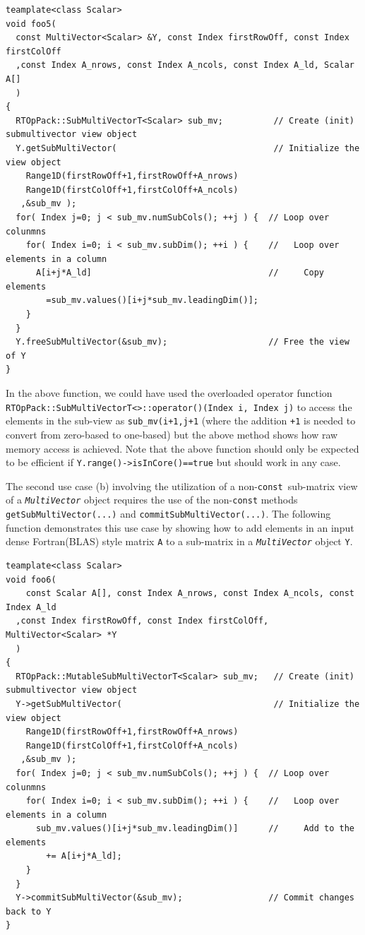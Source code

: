 {\scriptsize\begin{verbatim}
teamplate<class Scalar>
void foo5(
  const MultiVector<Scalar> &Y, const Index firstRowOff, const Index firstColOff
  ,const Index A_nrows, const Index A_ncols, const Index A_ld, Scalar A[]
  )
{
  RTOpPack::SubMultiVectorT<Scalar> sub_mv;          // Create (init) submultivector view object
  Y.getSubMultiVector(                               // Initialize the view object
    Range1D(firstRowOff+1,firstRowOff+A_nrows)
    Range1D(firstColOff+1,firstColOff+A_ncols)
   ,&sub_mv );
  for( Index j=0; j < sub_mv.numSubCols(); ++j ) {  // Loop over colunmns
    for( Index i=0; i < sub_mv.subDim(); ++i ) {    //   Loop over elements in a column
      A[i+j*A_ld]                                   //     Copy elements
        =sub_mv.values()[i+j*sub_mv.leadingDim()];
    }
  }
  Y.freeSubMultiVector(&sub_mv);                    // Free the view of Y
}
\end{verbatim}}

In the above function, we could have used the overloaded operator
function
{}\texttt{RTOpPack::\-Sub\-Multi\-VectorT<>::\-operator()(Index i,
Index j)} to access the elements in the sub-view as
{}\texttt{sub\_mv(i+1,j+1} (where the addition {}\texttt{+1} is needed
to convert from zero-based to one-based) but the above method shows
how raw memory access is achieved.  Note that the above function
should only be expected to be efficient if
{}\texttt{Y.range()->isInCore()==true} but should work in any case.

The second use case (b) involving the utilization of a
non-{}\texttt{const}\ sub-matrix view of a
{}\texttt{\textit{Multi\-Vector}} object requires the use of the
non-{}\texttt{const} methods {}\texttt{get\-Sub\-Multi\-Vector(...)}
and {}\texttt{commit\-Sub\-Multi\-Vector(...)}.  The following
function demonstrates this use case by showing how to add elements in
an input dense Fortran(BLAS) style matrix {}\texttt{A} to a sub-matrix
in a {}\texttt{\textit{Multi\-Vector}} object {}\texttt{Y}.

{\scriptsize\begin{verbatim}
teamplate<class Scalar>
void foo6(
	const Scalar A[], const Index A_nrows, const Index A_ncols, const Index A_ld
  ,const Index firstRowOff, const Index firstColOff, MultiVector<Scalar> *Y
  )
{
  RTOpPack::MutableSubMultiVectorT<Scalar> sub_mv;   // Create (init) submultivector view object
  Y->getSubMultiVector(                              // Initialize the view object
    Range1D(firstRowOff+1,firstRowOff+A_nrows)
    Range1D(firstColOff+1,firstColOff+A_ncols)
   ,&sub_mv );
  for( Index j=0; j < sub_mv.numSubCols(); ++j ) {  // Loop over colunmns
    for( Index i=0; i < sub_mv.subDim(); ++i ) {    //   Loop over elements in a column
      sub_mv.values()[i+j*sub_mv.leadingDim()]      //     Add to the elements
        += A[i+j*A_ld];
    }
  }
  Y->commitSubMultiVector(&sub_mv);                 // Commit changes back to Y
}
\end{verbatim}}

